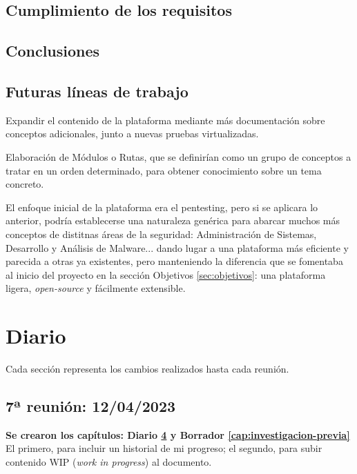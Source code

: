     \section{Cumplimiento de los requisitos}
    
    \section{Conclusiones}
    
    \section{Futuras líneas de trabajo}
        \label{sec:futuras-lineas-trabajo}
        
        Expandir el contenido de la plataforma mediante más documentación sobre conceptos adicionales, junto a nuevas pruebas virtualizadas.
        
        Elaboración de Módulos o Rutas, que se definirían como un grupo de conceptos a tratar en un orden determinado, para obtener conocimiento sobre un tema concreto.
        
        El enfoque inicial de la plataforma era el pentesting, pero si se aplicara lo anterior, podría establecerse una naturaleza genérica para abarcar muchos más conceptos de distitnas áreas de la seguridad: Administración de Sistemas, Desarrollo y Análisis de Malware... dando lugar a una plataforma más eficiente y parecida a otras ya existentes, pero manteniendo la diferencia que se fomentaba al inicio del proyecto en la sección Objetivos \ref{sec:objetivos}: una plataforma ligera, \textit{open-source} y fácilmente extensible.

        \cleardoublepage
        


\chapter{Diario}
    \label{cap:diario}

    Cada sección representa los cambios realizados hasta cada reunión.

    \section{7ª reunión: 12/04/2023}
    
        \textbf{Se crearon los capítulos: Diario \ref{cap:diario} y Borrador \ref{cap:investigacion-previa}} \\
        El primero, para incluir un historial de mi progreso; el segundo, para subir contenido WIP (\textit{work in progress}) al documento.
        
